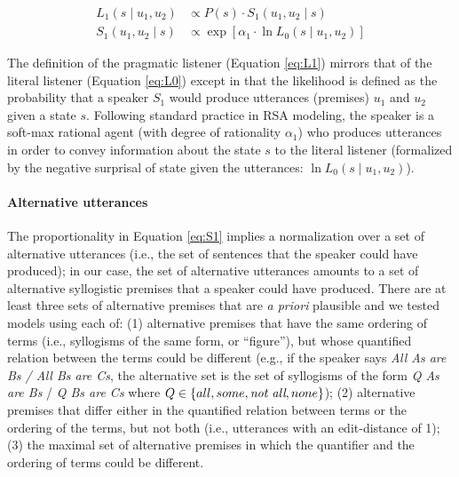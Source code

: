 \documentclass[floatsintext, doc]{apa6}
\begin{document}
\begin{align}
L_1(s \mid u_1,  u_2)& \propto  P(s)\cdot S_1(u_1, u_2 \mid s)  \label{eq:L1} \\ 
S_1(u_1, u_2 \mid s) &\propto  \exp [ \alpha_1 \cdot \ln L_0(s \mid u_1,  u_2)]  \label{eq:S1}
\end{align}

The definition of the pragmatic listener (Equation \ref{eq:L1}) mirrors that of the literal listener (Equation \ref{eq:L0}) except in that the likelihood is defined as the probability that a speaker $S_1$ would produce utterances (premises) $u_1$ and $u_2$ given a state $s$.
Following standard practice in RSA modeling, the speaker is a soft-max rational agent (with degree of rationality $\alpha_1$) who produces utterances in order to convey information about the state $s$ to the literal listener (formalized by the negative surprisal of state given the utterances: $\ln L_0(s \mid u_1,  u_2)$).

\paragraph{Alternative utterances}
The proportionality in Equation \ref{eq:S1} implies a normalization over a set of alternative utterances (i.e., the set of sentences that the speaker could have produced); in our case, the set of alternative utterances amounts to a set of alternative syllogistic premises that a speaker could have produced. 
There are at least three sets of alternative premises that are \emph{a priori} plausible and we tested models using each of: (1) alternative premises that have the same ordering of terms (i.e., syllogisms of the same form, or ``figure''), but whose quantified relation between the terms could be different (e.g., if the speaker says \emph{All As are Bs / All Bs are Cs}, the alternative set is the set of syllogisms of the form \emph{Q As are Bs} / \emph{Q Bs are Cs} where $Q \in \{all, some, \emph{not all}, none\}$); (2) alternative premises that differ either in the quantified relation between terms or the ordering of the terms, but not both (i.e., utterances with an edit-distance of 1); (3) the maximal set of alternative premises in which the quantifier and the ordering of terms could be different.
\end{document}
